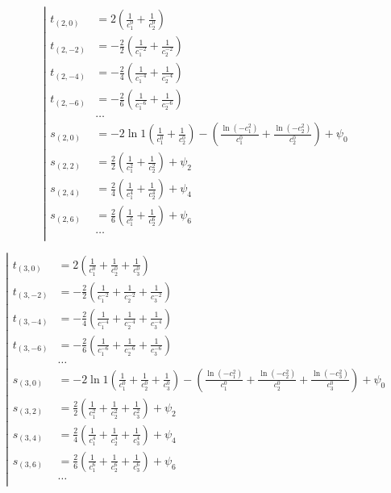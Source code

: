 \begin{equation*} \left| \begin{aligned}
t_{(2,0)} &=
  2
  \left(
  \frac{1}{c_1^0}
+ \frac{1}{c_2^0}
  \right) \\
%
t_{(2,-2)} &=
- \frac{2}{2}
  \left(
  \frac{1}{c_1^{-2}}
+ \frac{1}{c_2^{-2}}
  \right) \\
%
t_{(2,-4)} &=
- \frac{2}{4}
  \left(
  \frac{1}{c_1^{-4}}
+ \frac{1}{c_2^{-4}}
  \right) \\
%
t_{(2,-6)} &=
- \frac{2}{6}
  \left(
  \frac{1}{c_1^{-6}}
+ \frac{1}{c_2^{-6}}
  \right) \\
%
&\ldots \\
%
s_{(2,0)} &=
- 2 \ln{1}
  \left(
  \frac{1}{c_1^0}
+ \frac{1}{c_2^0}
  \right)
- \left(
  \frac{\ln{(- c_1^2)}}{c_1^0}
+ \frac{\ln{(- c_2^2)}}{c_2^0}
  \right)
+ \psi_0 \\
%
s_{(2,2)} &=
  \frac{2}{2}
  \left(
  \frac{1}{c_1^2}
+ \frac{1}{c_2^2}
  \right)
+ \psi_2 \\
%
s_{(2,4)} &=
  \frac{2}{4}
  \left(
  \frac{1}{c_1^4}
+ \frac{1}{c_2^4}
  \right)
+ \psi_4 \\
%
s_{(2,6)} &=
  \frac{2}{6}
  \left(
  \frac{1}{c_1^6}
+ \frac{1}{c_2^6}
  \right)
+ \psi_6 \\
%
&\ldots \\
\end{aligned} \right. \end{equation*}

\begin{equation*} \left| \begin{aligned}
t_{(3,0)} &=
  2
  \left(
  \frac{1}{c_1^0}
+ \frac{1}{c_2^0}
+ \frac{1}{c_3^0}
  \right) \\
%
t_{(3,-2)} &=
- \frac{2}{2}
  \left(
  \frac{1}{c_1^{-2}}
+ \frac{1}{c_2^{-2}}
+ \frac{1}{c_3^{-2}}
  \right) \\
%
t_{(3,-4)} &=
- \frac{2}{4}
  \left(
  \frac{1}{c_1^{-4}}
+ \frac{1}{c_2^{-4}}
+ \frac{1}{c_3^{-4}}
  \right) \\
%
t_{(3,-6)} &=
- \frac{2}{6}
  \left(
  \frac{1}{c_1^{-6}}
+ \frac{1}{c_2^{-6}}
+ \frac{1}{c_3^{-6}}
  \right) \\
%
&\ldots \\
%
s_{(3,0)} &=
- 2 \ln{1}
  \left(
  \frac{1}{c_1^0}
+ \frac{1}{c_2^0}
+ \frac{1}{c_3^0}
  \right)
- \left(
  \frac{\ln{(- c_1^2)}}{c_1^0}
+ \frac{\ln{(- c_2^2)}}{c_2^0}
+ \frac{\ln{(- c_3^2)}}{c_3^0}
  \right)
+ \psi_0 \\
%
s_{(3,2)} &=
  \frac{2}{2}
  \left(
  \frac{1}{c_1^2}
+ \frac{1}{c_2^2}
+ \frac{1}{c_3^2}
  \right)
+ \psi_2 \\
%
s_{(3,4)} &=
  \frac{2}{4}
  \left(
  \frac{1}{c_1^4}
+ \frac{1}{c_2^4}
+ \frac{1}{c_3^4}
  \right)
+ \psi_4 \\
%
s_{(3,6)} &=
  \frac{2}{6}
  \left(
  \frac{1}{c_1^6}
+ \frac{1}{c_2^6}
+ \frac{1}{c_3^6}
  \right)
+ \psi_6 \\
%
&\ldots \\
\end{aligned} \right. \end{equation*}

